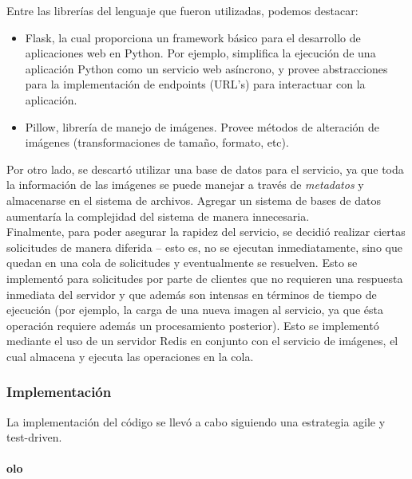 \documentclass[11pt,letterpaper]{article}
\begin{document}
Entre las librerías del lenguaje que fueron utilizadas, podemos destacar:
\begin{itemize}
    \item Flask\cite{flask}, la cual proporciona un framework básico para el desarrollo de aplicaciones web en Python. Por ejemplo, simplifica la ejecución de una aplicación Python como un servicio web asíncrono, y provee abstracciones para la implementación de endpoints (URL's) para interactuar con la aplicación.
    \item Pillow\cite{pillow}, librería de manejo de imágenes. Provee métodos de alteración de imágenes (transformaciones de tamaño, formato, etc).
\end{itemize}

Por otro lado, se descartó utilizar una base de datos para el servicio, ya que toda la información de las imágenes se puede manejar a través de \emph{metadatos} y almacenarse en el sistema de archivos. Agregar un sistema de bases de datos aumentaría la complejidad del sistema de manera innecesaria.\\

Finalmente, para poder asegurar la rapidez del servicio, se decidió realizar ciertas solicitudes de manera diferida -- esto es, no se ejecutan inmediatamente, sino que quedan en una cola de solicitudes y eventualmente se resuelven. Esto se implementó para solicitudes por parte de clientes que no requieren una respuesta inmediata del servidor y que además son intensas en términos de tiempo de ejecución (por ejemplo, la carga de una nueva imagen al servicio, ya que ésta operación requiere además un procesamiento posterior). Esto se implementó mediante el uso de un servidor Redis en conjunto con el servicio de imágenes, el cual almacena y ejecuta las operaciones en la cola.

\subsubsection{Implementación}

La implementación del código se llevó a cabo siguiendo una estrategia agile y test-driven.

\paragraph{olo}

\newpage
\end{document}
